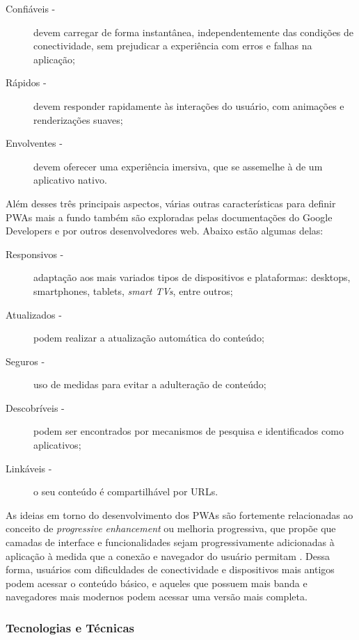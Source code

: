 \begin{description}
\item[Confiáveis -]devem carregar de forma instantânea, independentemente das condições de conectividade, sem prejudicar a experiência com erros e falhas na aplicação;
\item[Rápidos -]devem responder rapidamente às interações do usuário, com animações e renderizações suaves;
\item[Envolventes -]devem oferecer uma experiência imersiva, que se assemelhe à de um aplicativo nativo.
\end{description}

Além desses três principais aspectos, várias outras características para definir PWAs mais a fundo também são exploradas pelas documentações do Google Developers \cite{googledevpwachecklist} e por outros desenvolvedores web. Abaixo estão algumas delas:

\begin{description}
\item[Responsivos -]adaptação aos mais variados tipos de dispositivos e plataformas: desktops, smartphones, tablets, \textit{smart TVs}, entre outros;
\item[Atualizados -]podem realizar a atualização automática do conteúdo;
\item[Seguros -]uso de medidas para evitar a adulteração de conteúdo;
\item[Descobríveis -]podem ser encontrados por mecanismos de pesquisa e identificados como aplicativos;
\item[Linkáveis -]o seu conteúdo é compartilhável por URLs.
\end{description}

As ideias em torno do desenvolvimento dos PWAs são fortemente relacionadas ao conceito de \textit{progressive enhancement} ou melhoria progressiva, que propõe que camadas de interface e funcionalidades sejam progressivamente adicionadas à aplicação à medida que a conexão e navegador do usuário permitam \cite{champeon}. Dessa forma, usuários com dificuldades de conectividade e dispositivos mais antigos podem acessar o conteúdo básico, e aqueles que possuem mais banda e navegadores mais modernos podem acessar uma versão mais completa.

\subsubsection{Tecnologias e Técnicas}

